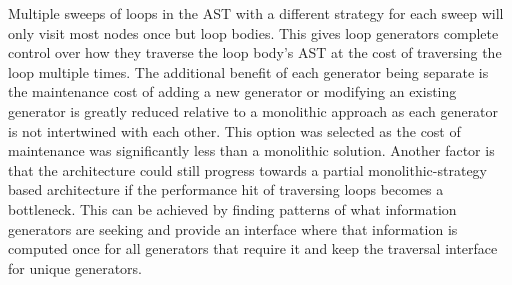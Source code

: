 Multiple sweeps of loops in the AST with a different strategy for each sweep
will only visit most nodes once but loop bodies.
This gives loop generators complete control over how they traverse the loop
body's AST at the cost of traversing the loop multiple times.
The additional benefit of each generator being separate is the maintenance cost
of adding a new generator or modifying an existing generator is greatly reduced
relative to a monolithic approach as each generator is not intertwined with
each other.
This option was selected as the cost of maintenance was significantly less
than a monolithic solution.
Another factor is that the architecture could still progress towards
a partial monolithic-strategy based architecture if the performance hit
of traversing loops becomes a bottleneck.
This can be achieved by finding patterns of what information generators are
seeking and provide an interface where that information is computed once for
all generators that require it and keep the traversal interface for unique generators.

